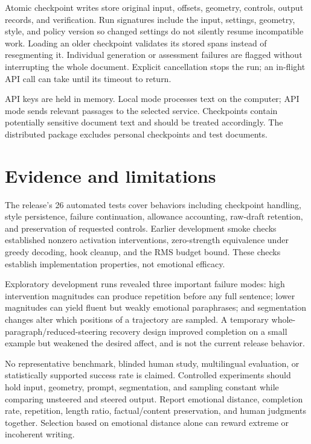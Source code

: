 \documentclass[manuscript,screen,nonacm]{acmart}
\begin{document}
Atomic checkpoint writes store original input, offsets, geometry,
controls, output records, and verification. Run signatures include the
input, settings, geometry, style, and policy version so changed settings
do not silently resume incompatible work. Loading an older checkpoint
validates its stored spans instead of resegmenting it. Individual
generation or assessment failures are flagged without interrupting the
whole document. Explicit cancellation stops the run; an in-flight API
call can take until its timeout to return.

API keys are held in memory. Local mode processes text on the computer;
API mode sends relevant passages to the selected service. Checkpoints
contain potentially sensitive document text and should be treated
accordingly. The distributed package excludes personal checkpoints and
test documents.

\section{Evidence and limitations}\label{evidence-and-limitations}

The release's 26 automated tests cover behaviors including checkpoint
handling, style persistence, failure continuation, allowance accounting,
raw-draft retention, and preservation of requested controls. Earlier
development smoke checks established nonzero activation interventions,
zero-strength equivalence under greedy decoding, hook cleanup, and the
RMS budget bound. These checks establish implementation properties, not
emotional efficacy.

Exploratory development runs revealed three important failure modes:
high intervention magnitudes can produce repetition before any full
sentence; lower magnitudes can yield fluent but weakly emotional
paraphrases; and segmentation changes alter which positions of a
trajectory are sampled. A temporary whole-paragraph/reduced-steering
recovery design improved completion on a small example but weakened the
desired affect, and is not the current release behavior.

No representative benchmark, blinded human study, multilingual
evaluation, or statistically supported success rate is claimed.
Controlled experiments should hold input, geometry, prompt,
segmentation, and sampling constant while comparing unsteered and
steered output. Report emotional distance, completion rate, repetition,
length ratio, factual/content preservation, and human judgments
together. Selection based on emotional distance alone can reward extreme
or incoherent writing.
\end{document}
